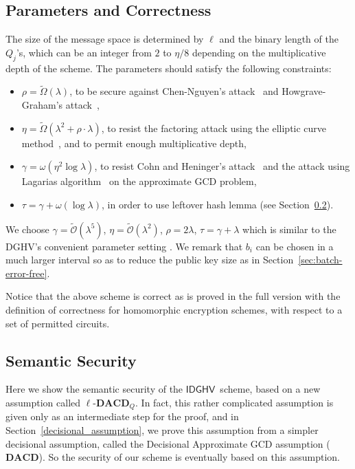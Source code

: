\documentclass{llncs}
\newcommand*{\CDGHV}{\ensuremath{\mathsf{IDGHV}}}
\begin{document}
\subsection{Parameters and Correctness}\label{parameter}
The size of the message space is determined by $\ell$ and the binary
length of the $Q_j$'s, which can be an integer from $2$ to $\eta/8$
depending on the multiplicative depth of the scheme.  
The parameters should satisfy the following constraints:  
\begin{itemize}
\renewcommand{\labelitemi}{\tiny $\bullet$}
\itemsep.4em
\item $\rho =\tilde\Omega(\lambda)$, to be secure against Chen-Nguyen's attack~\cite{CN2012} and Howgrave-Graham's attack~\cite{How2001},
\item $\eta=\tilde{\Omega}(\lambda^2 +\rho\cdot \lambda)$, to resist the factoring attack using the elliptic curve method~\cite{Len1987}, and to permit enough multiplicative depth,
\item $\gamma=\omega(\eta^2\log \lambda)$, to resist Cohn and Heninger's attack~\cite{CH2011} and the attack using Lagarias algorithm~\cite{Lag1985} on the approximate GCD problem,
\item $\tau=\gamma+\omega(\log\lambda)$, in order to use leftover
  hash lemma (see Section~\ref{reduce_acd}).
\end{itemize}
We choose $\gamma=\tilde{\mathcal{O}}(\lambda^5)$, $\eta=\tilde{\mathcal{O}}(\lambda^2)$,
$\rho=2\lambda$, $\tau=\gamma+\lambda$ which is similar to the DGHV's convenient parameter setting \cite{vDGHV2010}. We remark that $b_i$ can be chosen in a much larger interval so as to reduce the public key size as in Section~\ref{sec:batch-error-free}. 

Notice that the above scheme is correct as is proved in the full version \cite{KLYC2013} with the definition of correctness for
homomorphic encryption schemes, with respect to a set of permitted circuits.

\subsection{Semantic Security}\label{reduce_acd}

Here we show the semantic security of the \CDGHV\ scheme, based on a
new assumption called $\ell$-$\mathbf{DACD}_Q$.  In fact, this rather
complicated assumption is given only as an intermediate step for the
proof, and in Section~\ref{decisional_assumption}, we prove this
assumption from a simpler decisional assumption, called the Decisional 
Approximate GCD assumption ($\mathbf{DACD}$).  So the security of our scheme
is eventually based on this assumption.
\end{document}
